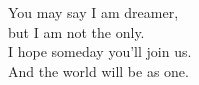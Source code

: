 \vspace{2em}
\begin{large}
\begin{quoteright}
  You may say I am dreamer, \\
  but I am not the only. \\
  I hope someday you'll join us. \\
  And the world will be as one.
\end{quoteright}
\end{large}




